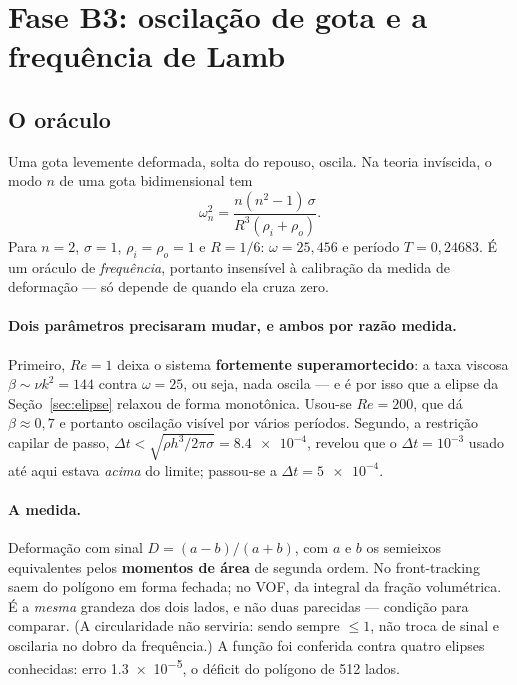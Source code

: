 \section{Fase B3: oscila\c{c}\~ao de gota e a frequ\^encia de Lamb}
\label{sec:lamb}

\subsection{O or\'aculo}

Uma gota levemente deformada, solta do repouso, oscila. Na teoria inv\'iscida, o
modo $n$ de uma gota bidimensional tem
\begin{equation}
  \omega_n^{2} = \frac{n(n^{2}-1)\,\sigma}{R^{3}(\rho_i + \rho_o)} .
  \label{eq:lamb}
\end{equation}
Para $n=2$, $\sigma=1$, $\rho_i=\rho_o=1$ e $R=1/6$: $\omega = 25{,}456$ e
per\'iodo $T = 0{,}24683$. \'E um or\'aculo de \emph{frequ\^encia}, portanto
insens\'ivel \`a calibra\c{c}\~ao da medida de deforma\c{c}\~ao --- s\'o depende
de quando ela cruza zero.

\paragraph{Dois par\^ametros precisaram mudar, e ambos por raz\~ao medida.}
Primeiro, $Re=1$ deixa o sistema \textbf{fortemente superamortecido}: a taxa
viscosa $\beta \sim \nu k^{2} = 144$ contra $\omega = 25$, ou seja, nada oscila
--- e \'e por isso que a elipse da Se\c{c}\~ao~\ref{sec:elipse} relaxou de forma
monot\^onica. Usou-se $Re = 200$, que d\'a $\beta \approx 0{,}7$ e portanto
oscila\c{c}\~ao vis\'ivel por v\'arios per\'iodos. Segundo, a restri\c{c}\~ao
capilar de passo, $\Delta t < \sqrt{\rho h^{3}/2\pi\sigma} = \num{8.4e-4}$,
revelou que o $\Delta t = 10^{-3}$ usado at\'e aqui estava \emph{acima} do
limite; passou-se a $\Delta t = \num{5e-4}$.

\paragraph{A medida.} Deforma\c{c}\~ao com sinal $D = (a-b)/(a+b)$, com $a$ e $b$
os semieixos equivalentes pelos \textbf{momentos de \'area} de segunda ordem. No
front-tracking saem do pol\'igono em forma fechada; no VOF, da integral da
fra\c{c}\~ao volum\'etrica. \'E a \emph{mesma} grandeza dos dois lados, e n\~ao
duas parecidas --- condi\c{c}\~ao para comparar. (A circularidade n\~ao serviria:
sendo sempre $\le 1$, n\~ao troca de sinal e oscilaria no dobro da frequ\^encia.)
A fun\c{c}\~ao foi conferida contra quatro elipses conhecidas: erro
\num{1.3e-5}, o d\'eficit do pol\'igono de 512 lados.

